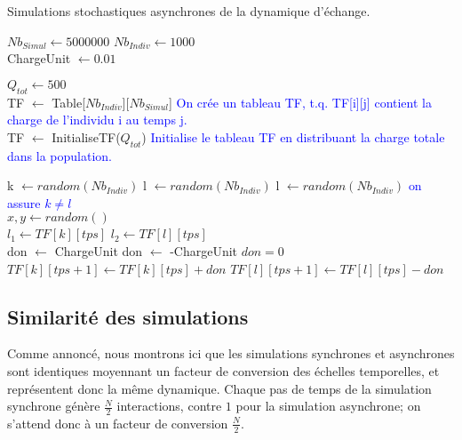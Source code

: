 \clearpage

\begin{algorithm}
\caption{Simulations stochastiques asynchrones de la dynamique d'échange.}
\begin{algorithmic}

\State $Nb_{Simul} \gets 5 000 000$
\State $Nb_{Indiv} \gets 1000$\\

\State ChargeUnit $\gets 0.01$

\State $Q_{tot} \gets 500$\\


\State TF $\gets$ Table[$Nb_{Indiv}$][$Nb_{Simul}$]
\State \textcolor{blue}{On crée un tableau TF, t.q. TF[i][j] contient la charge de l'individu i au temps j.}\\
\State TF $\gets$ InitialiseTF($Q_{tot}$)
\State \textcolor{blue}{Initialise le tableau TF en distribuant la charge totale dans la population.}\\

	
	\State k $\gets random(Nb_{Indiv})$
	\State l $\gets random(Nb_{Indiv})$
		\State l $\gets random(Nb_{Indiv})$
	\EndWhile
	\State \textcolor{blue}{on assure $k \neq l$}\\
		
	\State $x,y \gets random()$\\
		
	\State $l_1 \gets TF[k][tps]$
	\State $l_2 \gets TF[l][tps]$\\
		
		\State don $\gets$ ChargeUnit 
		\State don $\gets$ -ChargeUnit 
	\Else
		\State $don=0$
	\EndIf \\
		
	\State $TF[k][tps+1] \gets TF[k][tps]+don$
    \State $TF[l][tps+1] \gets TF[l][tps]-don$\\
\EndFor



\end{algorithmic}
\end{algorithm}

\subsection{Similarité des simulations}

Comme annoncé, nous montrons ici que les simulations synchrones et asynchrones sont identiques moyennant un facteur de conversion des échelles temporelles, et représentent donc la même dynamique. Chaque pas de temps de la simulation synchrone génère $\frac{N}{2}$ interactions, contre $1$ pour la simulation asynchrone; on s'attend donc à un facteur de conversion $\frac{N}{2}$.\\

